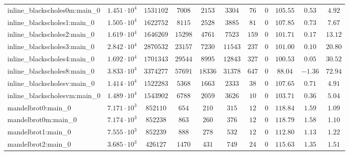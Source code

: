 \begin{tabular}{|l|c|c|c|c|c|c|c|c|c|c|}
inline\_blackscholes0m:main\_0 & $ 1.451 \cdot 10^{4} $ & $ 1531102  $ & $ 7008   $ & $ 2153   $ & $ 3304   $ & $ 76   $ & $ 0    $ & $ 105.55      $ & $ 0.53    $ & $ 4.92    $ \\
inline\_blackscholes1:main\_0  & $ 1.505 \cdot 10^{4} $ & $ 1622752  $ & $ 8115   $ & $ 2528   $ & $ 3885   $ & $ 81   $ & $ 0    $ & $ 107.85      $ & $ 0.73    $ & $ 7.67    $ \\
inline\_blackscholes2:main\_0  & $ 1.619 \cdot 10^{4} $ & $ 1646269  $ & $ 15298  $ & $ 4761   $ & $ 7523   $ & $ 159  $ & $ 0    $ & $ 101.71      $ & $ 0.17    $ & $ 13.12   $ \\
inline\_blackscholes3:main\_0  & $ 2.842 \cdot 10^{4} $ & $ 2870532  $ & $ 23157  $ & $ 7230   $ & $ 11543  $ & $ 237  $ & $ 0    $ & $ 101.00      $ & $ 0.10    $ & $ 20.80   $ \\
inline\_blackscholes4:main\_0  & $ 1.692 \cdot 10^{4} $ & $ 1701343  $ & $ 29544  $ & $ 8995   $ & $ 12843  $ & $ 327  $ & $ 0    $ & $ 100.53      $ & $ 0.05    $ & $ 30.52   $ \\
inline\_blackscholes8:main\_0  & $ 3.833 \cdot 10^{4} $ & $ 3374277  $ & $ 57691  $ & $ 18336  $ & $ 31378  $ & $ 647  $ & $ 0    $ & $ 88.04       $ & $ -1.36   $ & $ 72.94   $ \\
inline\_blackscholesv:main\_0  & $ 1.414 \cdot 10^{4} $ & $ 1522283  $ & $ 5368   $ & $ 1663   $ & $ 2333   $ & $ 38   $ & $ 0    $ & $ 107.65      $ & $ 0.71    $ & $ 4.91    $ \\
inline\_blackscholesvm:main\_0 & $ 1.489 \cdot 10^{4} $ & $ 1543902  $ & $ 6788   $ & $ 2059   $ & $ 3626   $ & $ 10   $ & $ 0    $ & $ 103.71      $ & $ 0.36    $ & $ 5.04    $ \\
mandelbrot0:main\_0            & $ 7.171 \cdot 10^{3} $ & $ 852110   $ & $ 654    $ & $ 210    $ & $ 315    $ & $ 12   $ & $ 0    $ & $ 118.84      $ & $ 1.59    $ & $ 1.09    $ \\
mandelbrot0m:main\_0           & $ 7.174 \cdot 10^{3} $ & $ 852238   $ & $ 863    $ & $ 260    $ & $ 376    $ & $ 12   $ & $ 0    $ & $ 118.79      $ & $ 1.58    $ & $ 1.10    $ \\
mandelbrot1:main\_0            & $ 7.555 \cdot 10^{3} $ & $ 852239   $ & $ 888    $ & $ 278    $ & $ 532    $ & $ 12   $ & $ 0    $ & $ 112.80      $ & $ 1.13    $ & $ 1.22    $ \\
mandelbrot2:main\_0            & $ 3.685 \cdot 10^{3} $ & $ 426127   $ & $ 1470   $ & $ 431    $ & $ 749    $ & $ 24   $ & $ 0    $ & $ 115.63      $ & $ 1.35    $ & $ 1.51    $ \\

\end{tabular}
